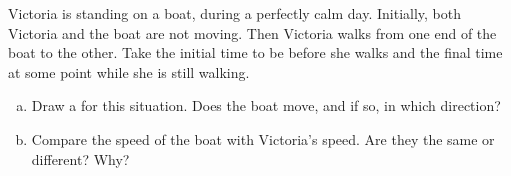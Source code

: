 \label{fnt7.1.1-3}

Victoria is standing on a boat, during a perfectly calm day. Initially, both Victoria and the boat are not moving. Then Victoria walks from one end of the boat to the other. Take the initial time to be before she walks and the final time at some point while she is still walking.

\begin{enumerate}[(a)]
	\item Draw a \pchart{} for this situation. Does the boat move, and if so, in which direction?
	\item Compare the speed of the boat with Victoria's speed. Are they the same or different? Why?
\end{enumerate}
